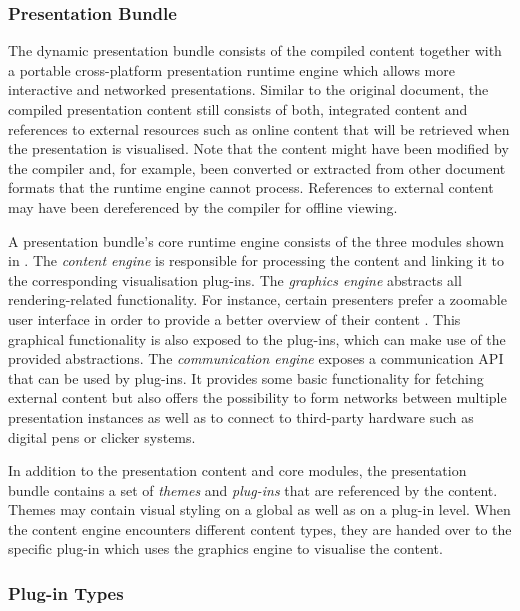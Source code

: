 \documentclass[a4paper,12pt]{report}
\begin{document}
    \subsubsection{\mxp Presentation Bundle}

     The dynamic \mxp presentation bundle consists of the compiled content
     together with a portable cross-platform presentation runtime engine which
     allows more interactive and networked presentations. Similar to the original
     document, the compiled presentation content still consists of both, integrated
     content and references to external resources such as online content that will
     be retrieved when the presentation is visualised. Note that the content might
     have been modified by the compiler and, for example, been converted or
     extracted from other document formats that the runtime engine cannot process.
     References to external content may have been dereferenced by the compiler for
     offline viewing.

     A presentation bundle's core runtime engine consists of the three modules
     shown in . The \emph{content engine} is responsible
     for processing the content and linking it to the corresponding
     visualisation plug-ins. The \emph{graphics engine} abstracts all
     rendering-related functionality. For instance, certain presenters prefer a
     zoomable user interface in order to provide a better overview of their
     content \citep{reuss-1}. This graphical functionality is also exposed to
     the plug-ins, which can make use of the provided abstractions. The
     \emph{communication engine} exposes a communication API that can be used
     by plug-ins. It provides some basic functionality for fetching external
     content but also offers the possibility to form networks between multiple
     \mxp presentation instances as well as to connect to third-party hardware
     such as digital pens or clicker systems.

     In addition to the presentation content and core modules, the presentation
     bundle contains a set of \emph{themes} and \emph{plug-ins} that are referenced
     by the content. Themes may contain visual styling on a global as well as on a
     plug-in level. When the content engine encounters different content types, they
     are handed over to the specific plug-in which uses the graphics engine to
     visualise the content.

    \subsubsection{Plug-in Types}
\end{document}
